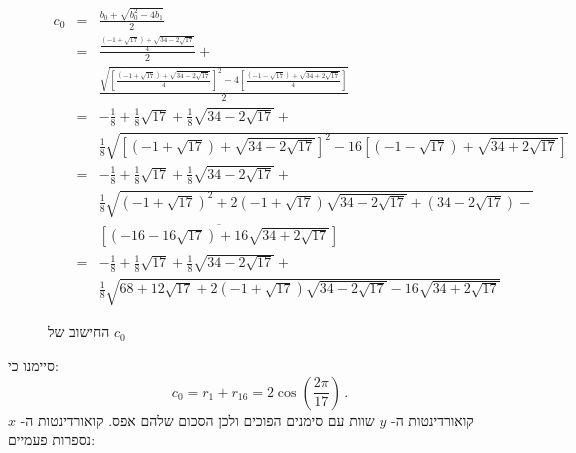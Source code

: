 \documentclass[11pt,a4paper]{article}
\newenvironment{form}[1]{%
\begin{displaymath}%
\renewcommand{\arraystretch}{#1}%
\begin{array}{lcl}}%
{\end{array}%
\end{displaymath}%
}
\newcommand*{\disfrac}[2]{\displaystyle\frac{#1}{#2}}
\begin{document}
\begin{figure}
\begin{form}{2.8}
c_0&=&\disfrac{b_0+\sqrt{b_0^2-4b_1}}{2}\\
&=&\disfrac{
     \disfrac{
     (-1+\sqrt{17}) + 
     \sqrt{34-2\sqrt{17}}
   }{4}}{2} + \\
&& 
    \disfrac{
       \sqrt{\left[\disfrac{
     (-1+\sqrt{17}) + 
     \sqrt{34-2\sqrt{17}}
   }{4}\right]^2-4\left[\disfrac{
     (-1-\sqrt{17}) + 
     \sqrt{34+2\sqrt{17}}
   }{4}\right]}
   }{2}\\
&=&-\disfrac{1}{8}+\disfrac{1}{8}\sqrt{17} + 
     \disfrac{1}{8}\sqrt{34-2\sqrt{17}}
    + \\
   &&
     \disfrac{1}{8}\sqrt{
     \left[
     (-1+\sqrt{17}) + 
     \sqrt{34-2\sqrt{17}}
   \right]^2-16\left[
     (-1-\sqrt{17}) + 
     \sqrt{34+2\sqrt{17}}
   \right]}
\\
&=&-\disfrac{1}{8}+\disfrac{1}{8}\sqrt{17} + 
     \disfrac{1}{8}\sqrt{34-2\sqrt{17}}
    + \\
   &&
     \disfrac{1}{8}\sqrt{
     (-1+\sqrt{17})^2 + 
     2(-1+\sqrt{17})\sqrt{34-2\sqrt{17}}+
     (34-2\sqrt{17})
   -}\\
   &&\overline{
     \left[(-16-16\sqrt{17}) + 
     16\sqrt{34+2\sqrt{17}}\right]
   }
\\
&=&-\disfrac{1}{8}+\disfrac{1}{8}\sqrt{17} + 
     \disfrac{1}{8}\sqrt{34-2\sqrt{17}}
    + \\
   &&
     \disfrac{1}{8}\sqrt{
     68+12\sqrt{17} + 
     2(-1+\sqrt{17})\sqrt{34-2\sqrt{17}}
   -16
     \sqrt{34+2\sqrt{17}}
   }

\end{form}
\caption{החישוב של $c_0$}\label{fig.c0}
\end{figure}
סיימנו כי:
\[
c_0=r_1+r_{16}=2\cos\left(\frac{2\pi}{17}\right)\,.
\]
קואורדינטות ה-%
$y$
שוות עם סימנים הפוכים ולכן הסכום שלהם אפס. קואורדינטות ה-%
$x$
נספרות פעמיים:
\begin{center}
\end{center}
\end{document}
